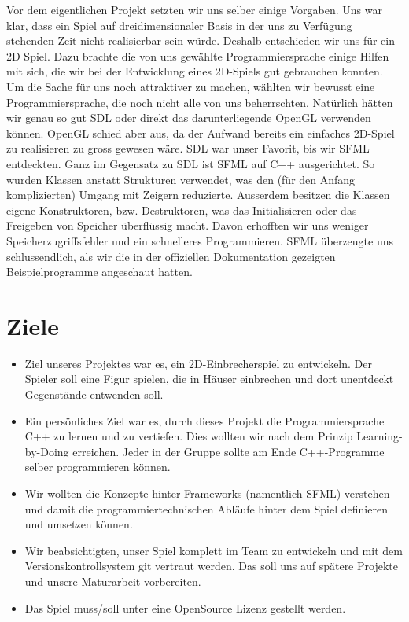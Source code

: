 \documentclass[11pt,a4paper]{scrbook}
\begin{document}
Vor dem eigentlichen Projekt setzten wir uns selber einige Vorgaben.
Uns war klar, dass ein Spiel auf dreidimensionaler Basis in der uns zu Verfügung stehenden Zeit nicht realisierbar sein würde. Deshalb entschieden wir uns für ein 2D Spiel.
Dazu brachte die von uns gewählte Programmiersprache einige Hilfen mit sich, die wir bei der Entwicklung eines 2D-Spiels gut gebrauchen konnten.
\\
Um die Sache für uns noch attraktiver zu machen, wählten wir bewusst eine Programmiersprache, die noch nicht alle von uns beherrschten.
Natürlich hätten wir genau so gut SDL oder direkt das darunterliegende OpenGL verwenden können.
OpenGL schied aber aus, da der Aufwand bereits ein einfaches 2D-Spiel zu realisieren zu gross gewesen wäre.
SDL war unser Favorit, bis wir SFML entdeckten.
Ganz im Gegensatz zu SDL ist SFML auf C++ ausgerichtet.
So wurden Klassen anstatt Strukturen verwendet, was den (für den
Anfang komplizierten) Umgang mit Zeigern reduzierte.
Ausserdem besitzen die Klassen eigene Konstruktoren, bzw. Destruktoren, was das Initialisieren
oder das Freigeben von Speicher überflüssig macht.
Davon erhofften wir uns weniger Speicherzugriffsfehler und ein schnelleres Programmieren.
SFML überzeugte uns schlussendlich, als wir die in der offiziellen Dokumentation gezeigten Beispielprogramme angeschaut hatten.

\section{Ziele}
\begin{itemize}
\item
Ziel unseres Projektes war es, ein 2D-Einbrecherspiel zu entwickeln. Der Spieler soll eine Figur spielen, die in Häuser einbrechen und dort unentdeckt Gegenstände entwenden soll.
\item
Ein persönliches Ziel war es, durch dieses Projekt die
Programmiersprache C++ zu lernen und zu vertiefen. Dies wollten wir nach dem Prinzip Learning-by-Doing erreichen. Jeder in der Gruppe sollte am Ende
C++-Programme selber programmieren können.
\item
Wir wollten
die Konzepte hinter Frameworks (namentlich SFML) verstehen und damit die
programmiertechnischen Abläufe hinter dem Spiel definieren und
umsetzen können.
\item
Wir beabsichtigten, unser Spiel komplett im Team zu entwickeln und
mit dem Versionskontrollsystem git vertraut werden. Das soll uns
auf spätere Projekte und unsere Maturarbeit vorbereiten.
\item
Das Spiel muss/soll unter eine OpenSource Lizenz gestellt werden.
\end{itemize}
\end{document}
